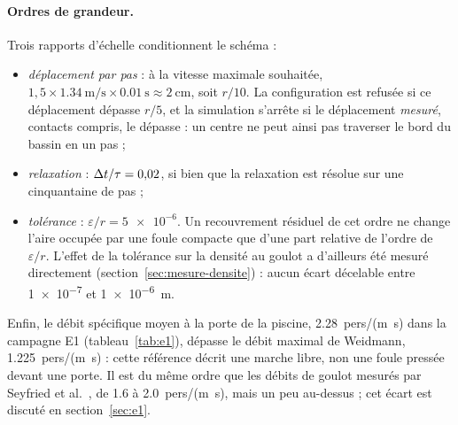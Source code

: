 \paragraph{Ordres de grandeur.}
Trois rapports d'échelle conditionnent le schéma :
\begin{itemize}
\item \emph{déplacement par pas} : à la vitesse maximale souhaitée,
  $1{,}5\times\SI{1.34}{\metre\per\second}\times\SI{0.01}{\second}\approx\SI{2}{\centi\metre}$,
  soit $r/10$. La configuration est refusée si ce déplacement dépasse $r/5$, et
  la simulation s'arrête si le déplacement \emph{mesuré}, contacts compris, le
  dépasse : un centre ne peut ainsi pas traverser le bord du bassin en un pas ;
\item \emph{relaxation} : $\Delta t/\tau=0{,}02$, si bien que la relaxation est
  résolue sur une cinquantaine de pas ;
\item \emph{tolérance} : $\varepsilon/r=\num{5e-6}$. Un recouvrement résiduel
  de cet ordre ne change l'aire occupée par une foule compacte que d'une part
  relative de l'ordre de $\varepsilon/r$. L'effet de la tolérance sur la densité
  au goulot a d'ailleurs été mesuré directement
  (section~\ref{sec:mesure-densite}) : aucun écart décelable entre \num{1e-7} et
  \SI{1e-6}{\metre}.
\end{itemize}
Enfin, le débit spécifique moyen à la porte de la piscine, \num{2.28}~pers/(\si{\metre\second})
dans la campagne E1 (tableau~\ref{tab:e1}), dépasse le débit maximal de Weidmann,
\num{1.225}~pers/(\si{\metre\second}) : cette référence décrit une marche libre, non une
foule pressée devant une porte. Il est du même ordre que les débits de goulot mesurés par
Seyfried et al.~\cite{seyfried2009}, de \num{1.6} à \num{2.0}~pers/(\si{\metre\second}),
mais un peu au-dessus ; cet écart est discuté en section~\ref{sec:e1}.
